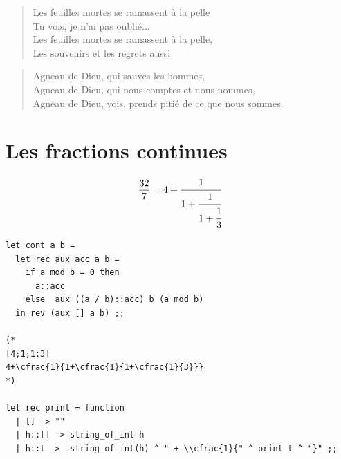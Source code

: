 \documentclass[11pt]{book}
\begin{document}
\begin{verse}
	Les feuilles mortes se ramassent à la pelle \\
	Tu vois, je n'ai pas oublié... \\
	Les feuilles mortes se ramassent à la pelle, \\
	Les souvenirs et les regrets aussi \\
\end{verse}

\begin{verse}
	Agneau de Dieu, qui sauves les hommes, \\
	Agneau de Dieu, qui nous comptes et nous nommes, \\
	Agneau de Dieu, vois, prends pitié de ce que nous sommes. \\
\end{verse}

\section{Les fractions continues}

$$
\frac{32}{7} = 4+\cfrac{1}{1+\cfrac{1}{1+\cfrac{1}{3}}}
$$


\begin{Verbatim}
let cont a b =
  let rec aux acc a b =
    if a mod b = 0 then
      a::acc
    else  aux ((a / b)::acc) b (a mod b)
  in rev (aux [] a b) ;;

(* 
[4;1;1:3]
4+\cfrac{1}{1+\cfrac{1}{1+\cfrac{1}{3}}}
*)

let rec print = function
  | [] -> ""
  | h::[] -> string_of_int h 
  | h::t ->  string_of_int(h) ^ " + \\cfrac{1}{" ^ print t ^ "}" ;;
\end{Verbatim}
\end{document}
